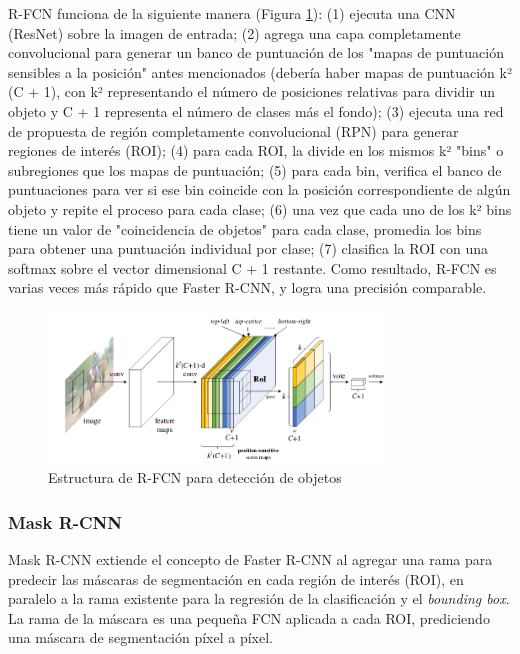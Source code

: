 \documentclass{bmvc2k}
\begin{document}
R-FCN funciona de la siguiente manera (Figura \ref{fig.rfcn}): (1) ejecuta una CNN (ResNet) sobre la imagen de entrada; (2) agrega una capa completamente convolucional para generar un banco de puntuación de los "mapas de puntuación sensibles a la posición" antes mencionados (debería haber mapas de puntuación k² (C + 1), con k² representando el número de posiciones relativas para dividir un objeto y C + 1 representa el número de clases más el fondo); (3) ejecuta una red de propuesta de región completamente convolucional (RPN) para generar regiones de interés (ROI); (4) para cada ROI, la divide en los mismos k² "bins" o subregiones que los mapas de puntuación; (5) para cada bin, verifica el banco de puntuaciones para ver si ese bin coincide con la posición correspondiente de algún objeto y repite el proceso para cada clase; (6) una vez que cada uno de los k² bins tiene un valor de "coincidencia de objetos" para cada clase, promedia los bins para obtener una puntuación individual por clase; (7) clasifica la ROI con una softmax sobre el vector dimensional C + 1 restante. Como resultado, R-FCN es varias veces más rápido que Faster R-CNN, y logra una precisión comparable.\\

\begin{figure}
\begin{center}
	\includegraphics[width=0.8\textwidth]{images/rfcn.png}
   \caption{Estructura de R-FCN para detección de objetos}
	\label{fig.rfcn}
\end{center}
\end{figure}

\subsubsection{Mask R-CNN}

Mask R-CNN extiende el concepto de Faster R-CNN al agregar una rama para predecir las máscaras de segmentación en cada región de interés (ROI), en paralelo a la rama existente para la regresión de la clasificación y el \textit{bounding box}. La rama de la máscara es una pequeña FCN aplicada
a cada ROI, prediciendo una máscara de segmentación píxel a píxel.\\
\end{document}
